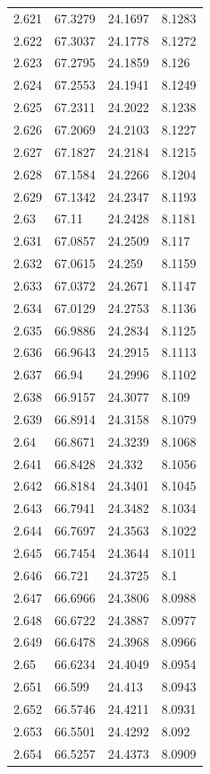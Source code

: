 \begin{tabular}{llll}
2.621 & 67.3279 & 24.1697 & 8.1283 \\
2.622 & 67.3037 & 24.1778 & 8.1272 \\
2.623 & 67.2795 & 24.1859 & 8.126 \\
2.624 & 67.2553 & 24.1941 & 8.1249 \\
2.625 & 67.2311 & 24.2022 & 8.1238 \\
2.626 & 67.2069 & 24.2103 & 8.1227 \\
2.627 & 67.1827 & 24.2184 & 8.1215 \\
2.628 & 67.1584 & 24.2266 & 8.1204 \\
2.629 & 67.1342 & 24.2347 & 8.1193 \\
2.63 & 67.11 & 24.2428 & 8.1181 \\
2.631 & 67.0857 & 24.2509 & 8.117 \\
2.632 & 67.0615 & 24.259 & 8.1159 \\
2.633 & 67.0372 & 24.2671 & 8.1147 \\
2.634 & 67.0129 & 24.2753 & 8.1136 \\
2.635 & 66.9886 & 24.2834 & 8.1125 \\
2.636 & 66.9643 & 24.2915 & 8.1113 \\
2.637 & 66.94 & 24.2996 & 8.1102 \\
2.638 & 66.9157 & 24.3077 & 8.109 \\
2.639 & 66.8914 & 24.3158 & 8.1079 \\
2.64 & 66.8671 & 24.3239 & 8.1068 \\
2.641 & 66.8428 & 24.332 & 8.1056 \\
2.642 & 66.8184 & 24.3401 & 8.1045 \\
2.643 & 66.7941 & 24.3482 & 8.1034 \\
2.644 & 66.7697 & 24.3563 & 8.1022 \\
2.645 & 66.7454 & 24.3644 & 8.1011 \\
2.646 & 66.721 & 24.3725 & 8.1 \\
2.647 & 66.6966 & 24.3806 & 8.0988 \\
2.648 & 66.6722 & 24.3887 & 8.0977 \\
2.649 & 66.6478 & 24.3968 & 8.0966 \\
2.65 & 66.6234 & 24.4049 & 8.0954 \\
2.651 & 66.599 & 24.413 & 8.0943 \\
2.652 & 66.5746 & 24.4211 & 8.0931 \\
2.653 & 66.5501 & 24.4292 & 8.092 \\
2.654 & 66.5257 & 24.4373 & 8.0909 \\

\end{tabular}
